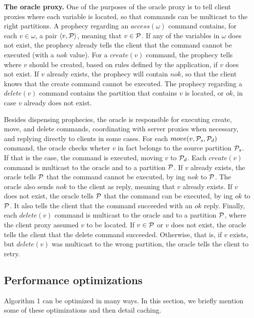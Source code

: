 \textbf{The oracle proxy.} One of the purposes of the oracle proxy is to tell client proxies where each variable is located, so that commands can be multicast to the right partitions.
A prophecy regarding an $access(\omega)$ command contains, for each $v \in \omega$, a pair $\langle v, \mathcal{P} \rangle$, meaning that $v \in \mathcal{P}$.
If any of the variables in $\omega$ does not exist, the prophecy already tells the client that the command cannot be executed (with a $nok$ value).
For a $create(v)$ command, the prophecy tells where $v$ should be created, based on rules defined by the application, if $v$ does not exist.
If $v$ already exists, the prophecy will contain $nok$, so that the client knows that the create command cannot be executed.
The prophecy regarding a $delete(v)$ command contains the partition that contains $v$ is located, or $ok$, in case $v$ already does not exist.

Besides dispensing prophecies, the oracle is responsible for executing create, move, and delete commands, coordinating with server proxies when necessary, and replying directly to clients in some cases.
For each $move(v,\mathcal{P}_s,\mathcal{P}_d)$ command, the oracle checks wheter $v$ in fact belongs to the source partition $\mathcal{P}_s$.
If that is the case, the command is executed, moving $v$ to $\mathcal{P}_d$.
Each $create(v)$ command is multicast to the oracle and to a partition $\mathcal{P}$.
If $v$ already exists, the oracle tells $\mathcal{P}$ that the command cannot be executed, by \rmcast{}ing $nok$ to $\mathcal{P}$.
The oracle also sends $nok$ to the client as reply, meaning that $v$ already exists.
If $v$ does not exist, the oracle tells $\mathcal{P}$ that the command can be executed, by \rmcast{}ing $ok$ to $\mathcal{P}$.
It also tells the client that the command succeeded with an $ok$ reply.
Finally, each $delete(v)$ command is multicast to the oracle and to a partition $\mathcal{P}$, where the client proxy assumed $v$ to be located.
If $v \in \mathcal{P}$ or $v$ does not exist, the oracle tells the client that the delete command succeeded.
Otherwise, that is, if $v$ exists, but $delete(v)$ was multicast to the wrong partition, the oracle tells the client to retry.


\subsection{Performance optimizations}
\label{sec:optm}

Algorithm 1 can be optimized in many ways. In this section, we briefly mention some of these optimizations and then detail caching.

